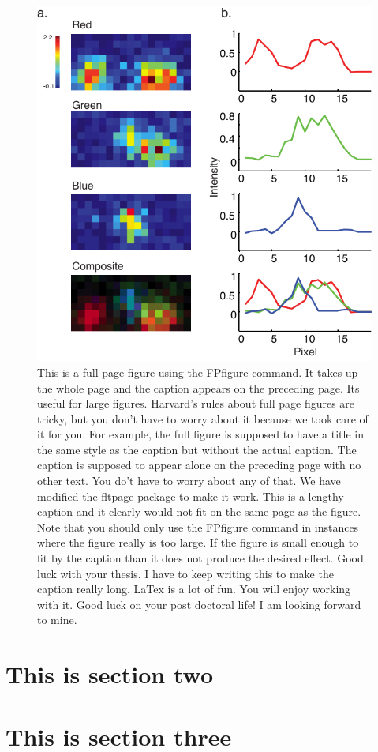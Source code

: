 \begin{figure}  
\includegraphics[width=\textwidth]{figures/fullpage}
\caption[Short figure name.]{This is a full page figure using the FPfigure command. It takes up the whole page and the caption appears on the preceding page. Its useful for large figures. Harvard's rules about full page figures are tricky, but you don't have to worry about it because we took care of it for you. For example, the full figure is supposed to have a title in the same style as the caption but without the actual caption. The caption is supposed to appear alone on the preceding page with no other text. You do't have to worry about any of that. We have modified the fltpage package to make it work. This is a lengthy caption and it clearly would not fit on the same page as the figure. Note that you should only use the FPfigure command in instances where the figure really is too large. If the figure is small enough to fit by the caption than it does not produce the desired effect. Good luck with your thesis. I have to keep writing this to make the caption really long. LaTex is a lot of fun. You will enjoy working with it. Good luck on your post doctoral life! I am looking forward to mine. \label{fig:myFullPageFigure}}
\end{figure}
\afterpage{\clearpage}


\section{This is section two}
\blindtext
\blindmathpaper

\section{This is section three}
\blindtext
\blindmathpaper